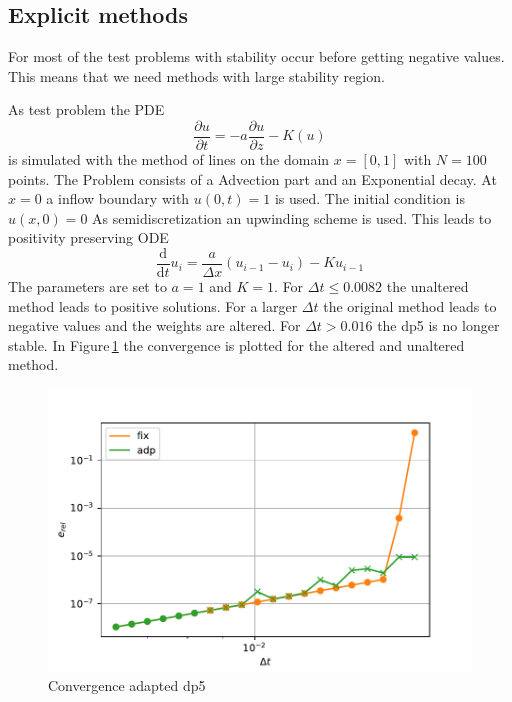\documentclass[a4paper]{scrartcl}
\numberwithin{equation}{section}
\theoremstyle{plain}
\theoremstyle{definition}
\numberwithin{theorem}{section}
\newcommand{\dt}{{\Delta t}}
\newcommand{\1}{\mathbbm{1}}
\begin{document}
\subsection{Explicit methods}
For most of the test problems with stability occur before getting negative values. This means that we need methods with large stability region.

As test problem the PDE
\begin{equation}
\frac{\partial u}{\partial t} = -a \frac{\partial u}{\partial z} - K (u)
\end{equation}
is simulated with the method of lines on the domain $x = [0,1]$ with $N =100$ points. The Problem consists of a Advection part and an Exponential decay. At $x =0$ a inflow boundary with $u(0,t)=1$ is used. The initial condition is $u(x,0)=0$
As semidiscretization an upwinding scheme is used. This leads to positivity preserving ODE
\begin{equation}
\frac{\mathrm d}{\mathrm d t} u_i = \frac{a}{\Delta x} \left( u_{i-1} - u_i \right) - K u_{i-1}
\end{equation}
The parameters are set to $a=1$ and $K=1$.
For $\dt \leq 0.0082$ the unaltered method leads to positive solutions. For a larger $\dt$ the original method leads to negative values and the weights are altered. For $\dt >0.016$ the dp5 is no longer stable.
In Figure\,\ref{fig:conv_expl} the convergence is plotted for the altered and unaltered method.



\begin{figure}[h]
\centering
\includegraphics[scale=0.75]{plots/conv_adde.pdf}
\caption{Convergence adapted dp5}
\label{fig:conv_expl}
\end{figure}
\end{document}
